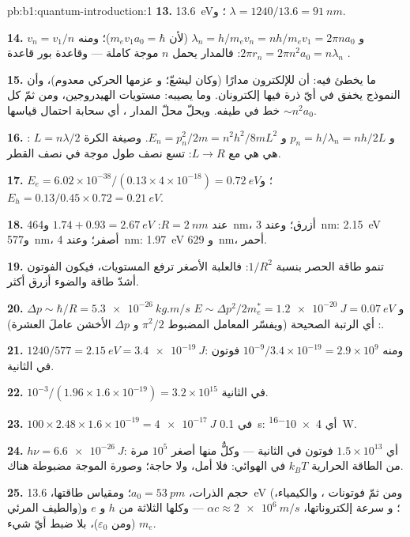 \begin{solution}{pb:b1:quantum-introduction:1}
\textbf{13.} \qty{13.6}{eV}؛ و $\lambda = 1240/13.6 = \qty{91}{nm}$.

\textbf{14.} $v_n = v_1/n$ و $\lambda_n = h/m_ev_n = nh/m_ev_1 = 2\pi na_0$ (لأن $m_ev_1a_0
= \hbar$)؛ ومنه $2\pi r_n = 2\pi n^2a_0 = n\lambda_n$: فالمدار يحمل $n$ موجة
كاملة --- وقاعدة بور قاعدة .

\textbf{15.} ما يخطئ فيه: أن للإلكترون مدارًا (وكان ليشعّ؛ و
 عزمها الحركي معدوم)، وأن النموذج يخفق في أيّ ذرة
فيها إلكترونان. وما يصيبه: مستويات الهيدروجين، ومن ثمّ كل خط في
طيفه. ويحلّ محلّ المدار ، أي سحابة احتمال
قياسها $\sim n^2a_0$.

\textbf{16.} : $L = n\lambda/2$ و $p_n = h/\lambda_n = nh/2L$ و $E_n =
p_n^2/2m = n^2h^2/8mL^2$. وصيغة الكرة هي هي مع $L \to R$:
 تسع نصف طول موجة في نصف القطر.

\textbf{17.} $E_e = 6.02 \times 10^{-38}/(0.13 \times 4 \times 10^{-18}) = \qty{0.72}{eV}$؛
و $E_h = 0.13/0.45 \times 0.72 = \qty{0.21}{eV}$.

\textbf{18.} عند $R = \qty{2}{nm}$: $1.74 + 0.93 = \qty{2.67}{eV}$ و\qty{464}{nm}، أزرق؛
وعند \qty{3}{nm}: \qty{2.15}{eV} و\qty{577}{nm}، أصفر؛ وعند \qty{4}{nm}: \qty{1.97}{eV} و
\qty{629}{nm}، أحمر.

\textbf{19.} تنمو طاقة الحصر بنسبة $1/R^2$: فالعلبة الأصغر ترفع
المستويات، فيكون الفوتون أشدّ طاقة والضوء أزرق أكثر.

\textbf{20.} $\Delta p \sim \hbar/R = \qty{5.3e-26}{kg.m/s}$ و $E \sim \Delta p^2/2m_e^\ast =
\qty{1.2e-20}{J} = \qty{0.07}{eV}$: أي الرتبة الصحيحة (ويفسّر المعامل المضبوط
$\pi^2/2$ و $\Delta p$ الأخشن عاملَ العشرة).

\textbf{21.} $1240/577 = \qty{2.15}{eV} = \qty{3.4e-19}{J}$: ومنه $10^{-9}/3.4 \times 10^{-19}
= 2.9 \times 10^9$ فوتون في الثانية.

\textbf{22.} $10^{-3}/(1.96 \times 1.6 \times 10^{-19}) = 3.2 \times 10^{15}$ في الثانية.

\textbf{23.} $100 \times 2.48 \times 1.6 \times 10^{-19} = \qty{4e-17}{J}$ في \qty{0.1}{s}:
أي \qty{4e-16}{W}.

\textbf{24.} $h\nu = \qty{6.6e-26}{J}$: أي $1.5 \times 10^{13}$ فوتون في الثانية ---
وكلٌّ منها أصغر $10^5$ مرة من الطاقة الحرارية $k_BT$ في
الهوائي: فلا أمل، ولا حاجة؛ وصورة الموجة مضبوطة هناك.

\textbf{25.} حجم الذرات، $a_0 = \qty{53}{pm}$؛ ومقياس طاقتها،
\qty{13.6}{eV} (ومن ثمّ فوتونات ، والكيمياء، والطيف المرئي)؛ و
سرعة إلكتروناتها، $\alpha c \approx \qty{2e6}{m/s}$ --- وكلها الثلاثة
من $h$ و $e$ و $m_e$ (ومن $\varepsilon_0$)، بلا ضبط أيّ شيء.
\end{solution}
